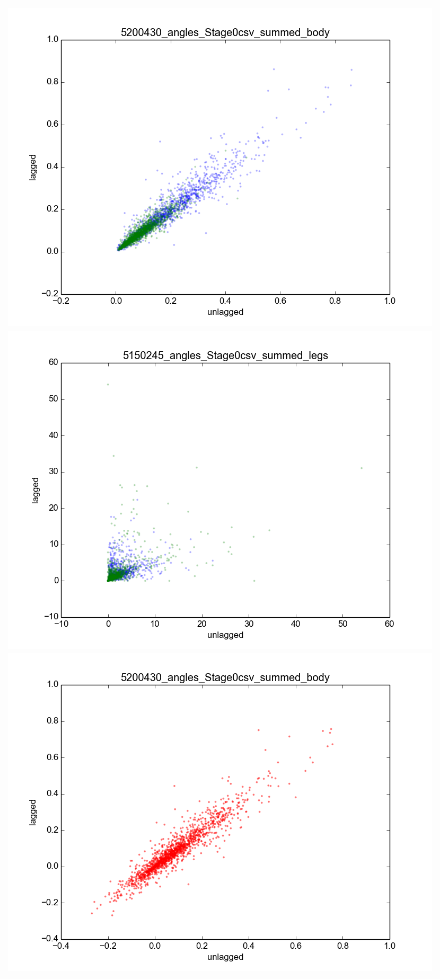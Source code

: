 \documentclass[12pt]{article}
\begin{document}
\begin{figure}\label{fig:poincare_plots}
  \begin{center}
    \includegraphics[scale=0.4]{poincare_1}
    \includegraphics[scale=0.4]{poincare_2}
    \includegraphics[scale=0.4]{poincare_3}

\end{center}
\end{figure}
\end{document}
